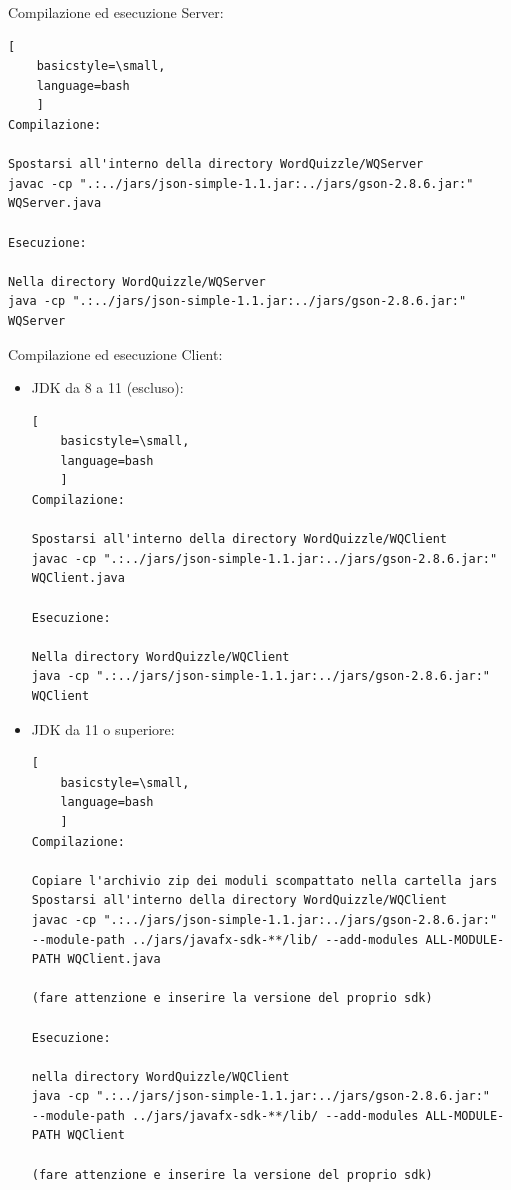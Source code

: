 \documentclass{article}
\begin{document}
Compilazione ed esecuzione Server:
\begin{lstlisting}[
    basicstyle=\small,
    language=bash
    ]
Compilazione:

Spostarsi all'interno della directory WordQuizzle/WQServer
javac -cp ".:../jars/json-simple-1.1.jar:../jars/gson-2.8.6.jar:" WQServer.java

Esecuzione:

Nella directory WordQuizzle/WQServer
java -cp ".:../jars/json-simple-1.1.jar:../jars/gson-2.8.6.jar:" WQServer
\end{lstlisting}
\clearpage
Compilazione ed esecuzione Client:
\begin{itemize}
\item JDK da 8 a 11 (escluso):
\begin{lstlisting}[
    basicstyle=\small,
    language=bash
    ]
Compilazione:

Spostarsi all'interno della directory WordQuizzle/WQClient
javac -cp ".:../jars/json-simple-1.1.jar:../jars/gson-2.8.6.jar:" WQClient.java

Esecuzione:

Nella directory WordQuizzle/WQClient
java -cp ".:../jars/json-simple-1.1.jar:../jars/gson-2.8.6.jar:" WQClient
\end{lstlisting}
\item JDK da 11 o superiore:
\begin{lstlisting}[
    basicstyle=\small,
    language=bash
    ]
Compilazione:

Copiare l'archivio zip dei moduli scompattato nella cartella jars
Spostarsi all'interno della directory WordQuizzle/WQClient
javac -cp ".:../jars/json-simple-1.1.jar:../jars/gson-2.8.6.jar:" 
--module-path ../jars/javafx-sdk-**/lib/ --add-modules ALL-MODULE-PATH WQClient.java

(fare attenzione e inserire la versione del proprio sdk)

Esecuzione:

nella directory WordQuizzle/WQClient
java -cp ".:../jars/json-simple-1.1.jar:../jars/gson-2.8.6.jar:" 
--module-path ../jars/javafx-sdk-**/lib/ --add-modules ALL-MODULE-PATH WQClient

(fare attenzione e inserire la versione del proprio sdk)
\end{lstlisting}
\end{itemize}

\clearpage
\end{document}
